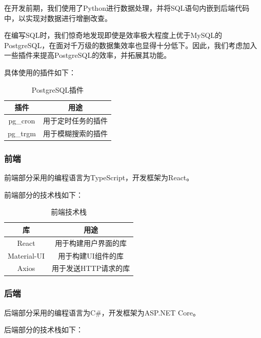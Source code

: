 \documentclass[UTF8,openany]{ctexbook}
\begin{document}
在开发前期，我们使用了Python进行数据处理，并将SQL语句内嵌到后端代码中，以实现对数据进行增删改查。

在编写SQL时，我们惊奇地发现即使是效率极大程度上优于MySQL的PostgreSQL，在面对千万级的数据集效率也显得十分低下。因此，我们考虑加入一些插件来提高PostgreSQL的效率，并拓展其功能。

具体使用的插件如下：

\begin{table}[H]
    \centering
    \begin{tabular}{cc}
    \toprule
    \textbf{插件} &  \textbf{用途} \\ 
    \midrule
    pg\_cron & 用于定时任务的插件 \\
    pg\_trgm & 用于模糊搜索的插件 \\
    \bottomrule
    \end{tabular}
    \caption{PostgreSQL插件}
\end{table}

\subsubsection{前端}

前端部分采用的编程语言为TypeScript，开发框架为React。

前端部分的技术栈如下：

\begin{table}[H]
    \centering
    \begin{tabular}{cc}
    \toprule
    \textbf{库} &  \textbf{用途} \\ 
    \midrule
    React & 用于构建用户界面的库 \\
    Material-UI & 用于构建UI组件的库 \\
    Axios & 用于发送HTTP请求的库 \\
    \bottomrule
    \end{tabular}
    \caption{前端技术栈}
\end{table}

\subsubsection{后端}

后端部分采用的编程语言为C\#，开发框架为ASP.NET Core。

后端部分的技术栈如下：
\end{document}
